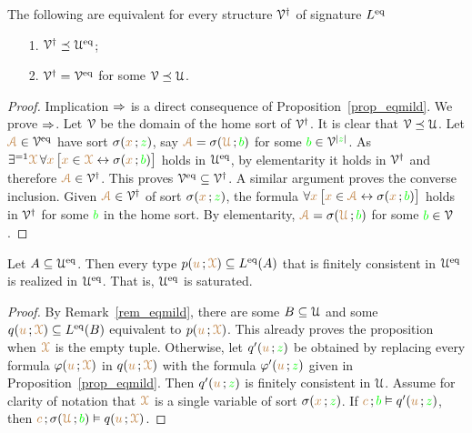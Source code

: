 \documentclass[creche.tex]{subfiles}
\begin{document}
\begin{proposition}
The following are equivalent for every structure $\V^\dag$ of signature $L^\eq$
\begin{itemize}
\item[1.] $\V^\dag\preceq\U^\eq$;
\item[2.] $\V^\dag=\V^\eq$ for some $\V\preceq\U$.
\end{itemize}
\end{proposition}
\begin{proof}
Implication $\IMP$ is a direct consequence of Proposition~\ref{prop_eqmild}.
We prove $\IMP$.
Let $\V$ be the domain of the home sort of $\V^\dag$.
It is clear that $\V\preceq\U$.
Let ${\vl\Aa}\in\V^\eq$ have sort $\sigma({\mr x}\,;{\gr z})$, say ${\vl\Aa}=\sigma({\mr\U}\,;{\gr b})$ for some ${\gr b}\in\V^{|{\gr z}|}$.
As $\E^{=1}{\vl\X}\, \A{\mr x}\,\big[{\mr x}\in{\vl\X}\iff\sigma({\mr x}\,;{\gr b})\big]$ holds in $\U^\eq$, by elementarity it holds in $\V^\dag$ and therefore ${\vl\Aa}\in\V^\dag$.
This proves $\V^\eq\subseteq\V^\dag$.
A similar argument proves the converse inclusion.
Given ${\vl\Aa}\in\V^\dag$ of sort $\sigma({\mr x}\,;{\gr z})$, the formula $\A{\mr x}\,\big[{\mr x}\in{\vl\Aa}\iff\sigma({\mr x}\,;{\gr b})\big]$ holds in $\V^\dag$ for some ${\gr b}$ in the home sort.
%
By elementarity, ${\vl\Aa}=\sigma({\mr\U}\,;{\gr b})$ for some ${\gr b}\in\V$.
\end{proof}

\begin{proposition}\label{prop_Ueq_saturated}
Let $A\subseteq\U^\eq$.
Then every type $p({\mr u}\,;{\vl\X})\subseteq L^\eq(A)$ that is finitely consistent in $\U^\eq$ is realized in $\U^\eq$.
That is, $\U^\eq$ is saturated.
\end{proposition}
\begin{proof}
By Remark~\ref{rem_eqmild}, there are some $B\subseteq\U$ and some $q({\mr u}\,;{\vl\X})\subseteq L^\eq(B)$ equivalent to $p({\mr u}\,;{\vl\X})$.
This already proves the proposition when ${\vl\X}$ is the empty tuple.
Otherwise, let $q'({\mr u}\,;{\gr z})$ be obtained by replacing every formula $\phi({\mr u}\,;{\vl\X})$ in $q({\mr u}\,;{\vl\X})$ with the formula $\phi'({\mr u}\,;{\gr z})$ given in Proposition~\ref{prop_eqmild}.
Then $q'({\mr u}\,;{\gr z})$ is finitely consistent in $\U$.
Assume for clarity of notation that ${\vl\X}$ is a single variable of sort $\sigma({\mr x}\,;{\gr z})$.
If ${\mr c}\,;{\gr b}\models q'({\mr u}\,;{\gr z})$, then  ${\mr c}\,;\sigma({\mr\U}\,;{\gr b})\models q({\mr u}\,;{\vl\X})$.
\end{proof}
\end{document}
